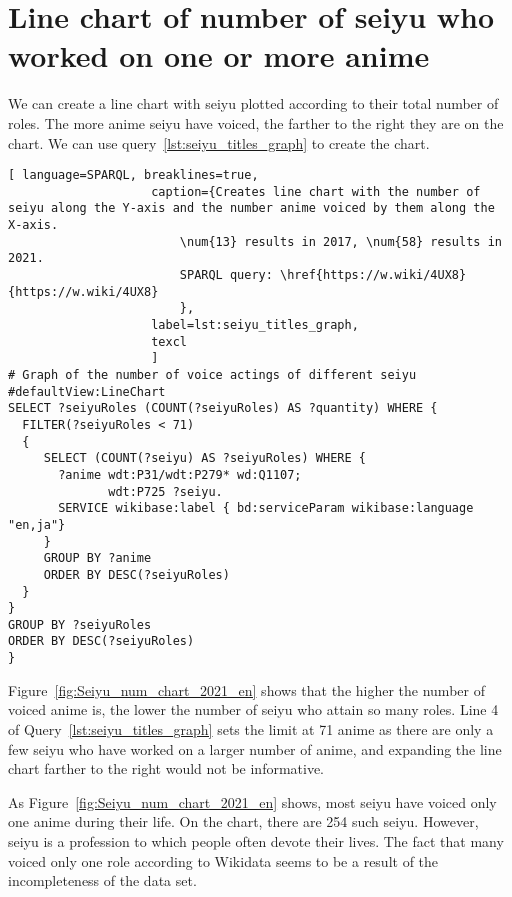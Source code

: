 \section{Line chart of number of seiyu who worked on one or more anime}

We can create a line chart with seiyu plotted according to their total number of roles. The more anime seiyu have voiced, the farther to the right they are on the chart. We can use query~\ref{lst:seiyu_titles_graph} to create the chart.

\begin{lstlisting}[ language=SPARQL, breaklines=true,
                    caption={Creates line chart with the number of seiyu along the Y-axis and the number anime voiced by them along the X-axis.
                        \num{13} results in 2017, \num{58} results in 2021.
                        SPARQL query: \href{https://w.wiki/4UX8}{https://w.wiki/4UX8}
                        },
                    label=lst:seiyu_titles_graph,
                    texcl 
                    ]
# Graph of the number of voice actings of different seiyu
#defaultView:LineChart
SELECT ?seiyuRoles (COUNT(?seiyuRoles) AS ?quantity) WHERE {
  FILTER(?seiyuRoles < 71)
  {
     SELECT (COUNT(?seiyu) AS ?seiyuRoles) WHERE {
       ?anime wdt:P31/wdt:P279* wd:Q1107;
              wdt:P725 ?seiyu.
       SERVICE wikibase:label { bd:serviceParam wikibase:language "en,ja"}
     }
     GROUP BY ?anime
     ORDER BY DESC(?seiyuRoles)
  }
}
GROUP BY ?seiyuRoles
ORDER BY DESC(?seiyuRoles)
}
\end{lstlisting}%

Figure~\ref{fig:Seiyu_num_chart_2021_en} shows that the higher the number of voiced anime is, the lower the number of seiyu who attain so many roles. Line \num{4} of Query~\ref{lst:seiyu_titles_graph} sets the limit at \num{71} anime as there are only a few seiyu who have worked on a larger number of anime, and expanding the line chart farther to the right would not be informative.

As Figure~\ref{fig:Seiyu_num_chart_2021_en} shows, most seiyu have voiced only one anime during their life. On the chart, there are \num{254} such seiyu. However, seiyu is a profession to which people often devote their lives. The fact that many voiced only one role according to Wikidata seems to be a result of the incompleteness of the data set.

\begin{figure*}[h]

    \setlength{\fboxsep}{0pt}%
    \setlength{\fboxrule}{1pt}%
	\caption[Line chart of the number of roles voiced by different seiyu, 2021.]{Line chart of number of roles voiced by different seiyu, 2021. The chart is constructed using the output of Query~\ref{lst:seiyu_titles_graph}.}%
    \label{fig:Seiyu_num_chart_2021_en}%
\end{figure*} 

